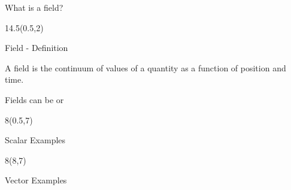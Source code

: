 \begin{frame}{What is a field?}
	\begin{textblock}{14.5}(0.5,2)

		\begin{myblock}[0.9]{Field - Definition}	
			
			A field is the continuum of values of a quantity as a function of position and time. 
			
			\vspace{12pt}
			
			Fields can be  or 
				
		\end{myblock}
	\end{textblock}
	\begin{textblock}{8}(0.5,7)

		\begin{myblock}[0.9]{Scalar Examples}	
			
			\vspace{1in}
				
		\end{myblock}
	\end{textblock}
	\begin{textblock}{8}(8,7)
		\begin{myblock}[0.9]{Vector Examples}	
			
			\vspace{1in}
				
		\end{myblock}

	

	\end{textblock}

%	 
%	 
%
% 
% 
%	
\end{frame}

